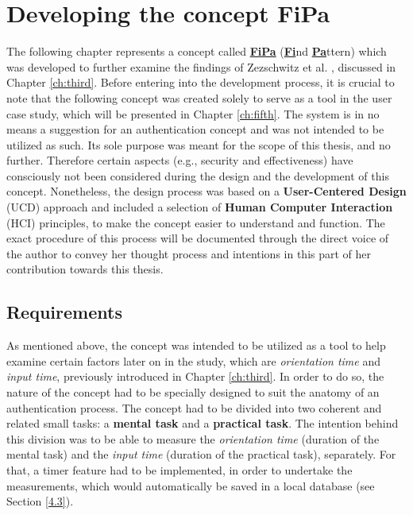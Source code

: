 
\chapter{Developing the concept FiPa}\label{ch:forth}
The following chapter represents a concept called \underline{\textbf{FiPa}} (\underline{\textbf{Fi}}nd \underline{\textbf{Pa}}ttern) which was developed to further examine the findings of Zezschwitz et al. \cite{Zezschwitz}, discussed in Chapter \ref{ch:third}. Before entering into the development process, it is crucial to note that the following concept was created solely to serve as a tool in the user case study, which will be presented in Chapter \ref{ch:fifth}. The system is in no means a suggestion for an authentication concept and was not intended to be utilized as such. Its sole purpose was meant for the scope of this thesis, and no further. Therefore certain aspects (e.g., security and effectiveness) have consciously not been considered during the design and the development of this concept. Nonetheless, the design process was based on a  \textbf{User-Centered Design} (UCD) approach and included a selection of \textbf{Human Computer Interaction} (HCI) principles, to make the concept easier to understand and function. The exact procedure of this process will be documented through the direct voice of the author to convey her thought process and intentions in this part of her contribution towards this thesis. 

\section{Requirements} \label{4.1}
As mentioned above, the concept was intended to be utilized as a tool to help examine certain factors later on in the study, which are \textit{orientation time} and \textit{input time}, previously introduced in Chapter \ref{ch:third}. In order to do so, the nature of the concept had to be specially designed to suit the anatomy of an authentication process. The concept had to be divided into two coherent and related small tasks: a \textbf{mental task} and a \textbf{practical task}. The intention behind this division was to be able to measure the \textit{orientation time} (duration of the mental task) and the \textit{input time} (duration of the practical task), separately. For that, a timer feature had to be implemented, in order to undertake the measurements, which would automatically be saved in a local database (see Section \ref{4.3}).\\

